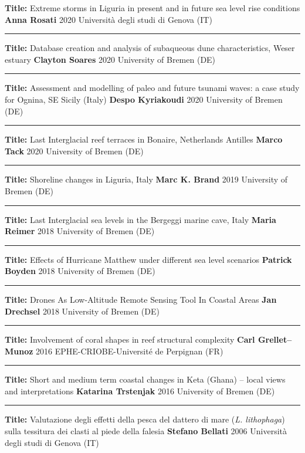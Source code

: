 \documentclass[%
               doublesided,
               paper=a4,
               fontsize=10pt
              ]{my-resume}
\begin{document}
    \publication
	{\textbf{Title:} Extreme storms in Liguria in present and in future sea level rise conditions} %
	{\textbf{Anna Rosati}} %
	{2020} %
	{Università degli studi di Genova (IT)} %
	{} %
\smallskip
\hrule
\smallskip
    \publication
	{\textbf{Title:} Database creation and analysis of subaqueous dune characteristics, Weser estuary} %
	{\textbf{Clayton Soares}} %
	{2020} %
	{University of Bremen (DE)} %
	{} %
\smallskip
\hrule
\smallskip
    \publication
	{\textbf{Title:} Assessment and modelling of paleo and future tsunami waves: a case study for Ognina, SE Sicily (Italy)} %
	{\textbf{Despo Kyriakoudi}} %
	{2020} %
	{University of Bremen (DE)}%
	{} %
\smallskip
\hrule
\smallskip
    \publication
	{\textbf{Title:} Last Interglacial reef terraces in Bonaire, Netherlands Antilles} %
	{\textbf{Marco Tack}} %
	{2020} %
	{University of Bremen (DE)} %
	{} %
\smallskip
\hrule
\smallskip
    \publication
	{\textbf{Title:} Shoreline changes in Liguria, Italy} %
	{\textbf{Marc K. Brand}} %
	{2019} %
	{University of Bremen (DE)} %
	{} %
\smallskip
\hrule
\smallskip
    \publication
	{\textbf{Title:} Last Interglacial sea levels in the Bergeggi marine cave, Italy} %
	{\textbf{Maria Reimer}} %
	{2018} %
	{University of Bremen (DE)}  %
	{} %
\smallskip
\hrule
\smallskip
    \publication
	{\textbf{Title:} Effects of Hurricane Matthew under different sea level scenarios} %
	{\textbf{Patrick Boyden}} %
	{2018} %
	{University of Bremen (DE)} %
	{} %
\smallskip
\hrule
\smallskip
    \publication
	{\textbf{Title:} Drones As Low-Altitude Remote Sensing Tool In Coastal Areas} %
	{\textbf{Jan Drechsel}} %
	{2018} %
	{University of Bremen (DE)} %
	{} %
\smallskip
\hrule
\smallskip
    \publication
	{\textbf{Title:} Involvement of coral shapes in reef structural complexity} %
	{\textbf{Carl Grellet–Munoz}} %
	{2016} %
	{EPHE-CRIOBE-Université de Perpignan (FR)} %
	{} %
\smallskip
\hrule
\smallskip
    \publication
	{\textbf{Title:} Short and medium term coastal changes in Keta (Ghana) – local views and interpretations} %
	{\textbf{Katarina Trstenjak}} %
	{2016} %
	{University of Bremen (DE)} %
	{} %
\smallskip
\hrule
\smallskip
    \publication
	{\textbf{Title:} Valutazione degli effetti della pesca del dattero di mare (\textit{L. lithophaga}) sulla tessitura dei clasti al piede della falesia} %
	{\textbf{Stefano Bellati}} %
	{2006} %
	{Università degli studi di Genova (IT)} %
	{} %
\newpage
\end{document}
